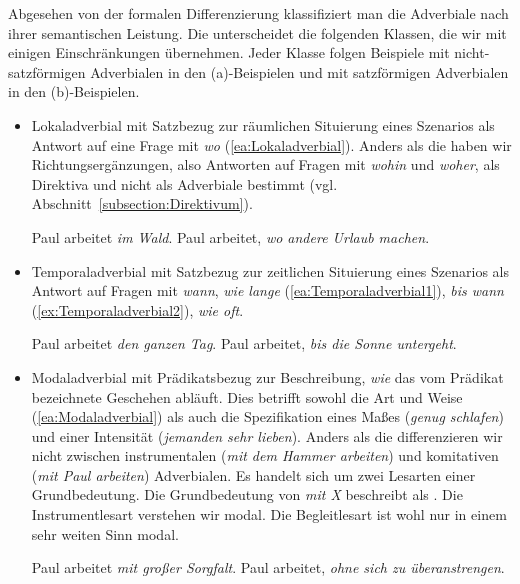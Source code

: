 Abgesehen von der formalen Differenzierung klassifiziert man die Adverbiale nach ihrer semantischen Leistung. Die \citet[516--519]{Duden2022} unterscheidet die folgenden Klassen, die wir mit einigen Einschränkungen übernehmen. Jeder Klasse folgen Beispiele mit nicht-satzförmigen Adverbialen in den (a)-Beispielen und mit satzförmigen Adverbialen in den (b)-Beispielen.

\begin{itemize}

\item Lokaladverbial mit Satzbezug zur räumlichen Situierung eines Szenarios als Antwort auf eine Frage mit \textit{wo} (\ref{ea:Lokaladverbial}). Anders als die \citet[516, §863]{Duden2022} haben wir Richtungsergänzungen, also Antworten auf Fragen mit \textit{wohin} und \textit{woher}, als Direktiva und nicht als Adverbiale bestimmt (vgl. Abschnitt~\ref{subsection:Direktivum}). 

\ea \label{ea:Lokaladverbial}
\ea \label{ea:Lokadverbial1} Paul arbeitet \textit{im Wald}.
\ex \label{ex:Lokaladverbial2}Paul arbeitet, \textit{wo andere Urlaub machen}.
\z 
\z 

\item Temporaladverbial mit Satzbezug zur zeitlichen Situierung eines Szenarios als Antwort auf Fragen mit \textit{wann}, \textit{wie lange} (\ref{ea:Temporaladverbial1}), \textit{bis wann} (\ref{ex:Temporaladverbial2}), \textit{wie oft}. 

\newpage
\ea \label{ea:Temporaladverbial}
\ea \label{ea:Temporaladverbial1} Paul arbeitet \textit{den ganzen Tag}.
\ex \label{ex:Temporaladverbial2} Paul arbeitet, \textit{bis die Sonne untergeht}.
\z 
\z 

\item Modaladverbial mit Prädikatsbezug zur Beschreibung, \textit{wie} das vom Prädikat bezeichnete Geschehen abläuft. Dies betrifft sowohl die Art und Weise (\ref{ea:Modaladverbial}) als auch die Spezifikation eines Maßes (\textit{genug schlafen}) und einer Intensität (\textit{jemanden sehr lieben}). Anders als die \citet[517, §864]{Duden2022} differenzieren wir nicht zwischen instrumentalen (\textit{mit dem Hammer arbeiten}) und komitativen (\textit{mit Paul arbeiten}) Adverbialen. Es handelt sich um zwei Lesarten einer Grundbedeutung. Die Grundbedeutung von \textit{mit X} beschreibt \citet[118]{Coseriu1970} als . Die Instrumentlesart verstehen wir modal. Die Begleitlesart ist wohl nur in einem sehr weiten Sinn modal. 

\ea \label{ea:Modaladverbial}
\ea \label{ea:Modaladverbial1} Paul arbeitet \textit{mit großer Sorgfalt}.
\ex \label{ex:Modaladverbial2} Paul arbeitet, \textit{ohne sich zu überanstrengen}.
\z 
\z 



\end{itemize}

